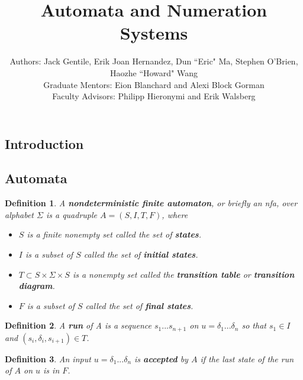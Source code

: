 \documentclass[landscape]{sciposter}
\title{Automata and Numeration Systems}
\author{
Authors: Jack Gentile, Erik Joan Hernandez, Dun ``Eric" Ma, Stephen O'Brien, Haozhe ``Howard" Wang\\
Graduate Mentors: Eion Blanchard and Alexi Block Gorman\\
Faculty Advisors: Philipp Hieronymi and
Erik Walsberg\\
}
\newtheorem*{definition}{Definition}
\begin{document}

\maketitle
\vspace{-3ex}
\begin{multicols}{3}  %



\section*{Introduction}
\begin{mdframed}[style=MyFrame]
\subsection*{Automata}
\end{mdframed}
	\begin{definition}A \textbf{nondeterministic finite automaton}, or briefly an nfa, over alphabet $\Sigma$ is a quadruple $A = (S, I, T, F)$, where
	\begin{itemize}
		\setlength{\itemsep}{-30pt}
		\item $S$ is a finite nonempty set called the set of \textbf{states}.\\
		\item $I$ is a subset of $S$ called the set of \textbf{initial states}.\\
		\item $T \subset S \times \Sigma \times S$ is a nonempty set called the \textbf{transition table} or \textbf{transition diagram}.\\
		\item $F$ is a subset of $S$ called the set of \textbf{final states}.
	\end{itemize}
\end{definition}
\begin{definition}
A \textbf{run} of A is a sequence $s_1...s_{n+1}$ on $u=\delta_1 ... \delta_n$ so that $s_1 \in I$ and $(s_i, \delta_i, s_{i+1}) \in T$.
\end{definition}
\begin{definition}
An input $u = \delta_1 ... \delta_n$ is \textbf{accepted} by $A$ if the last state of the run of $A$ on $u$ is in $F$.\\
\end{definition}


\end{multicols}
\end{document}
